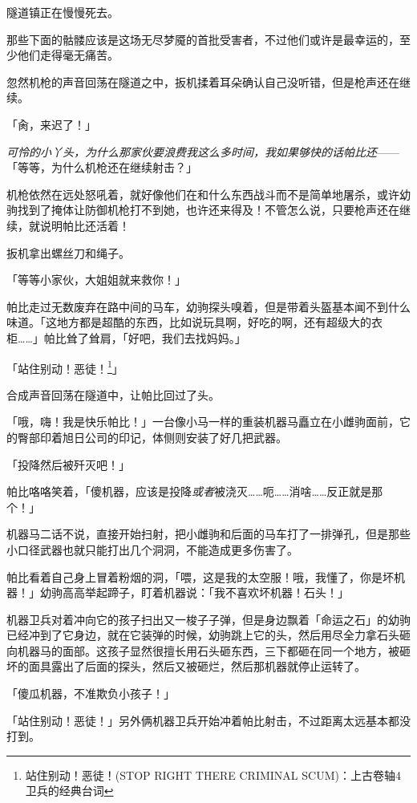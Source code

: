 隧道镇正在慢慢死去。

那些下面的骷髅应该是这场无尽梦魇的首批受害者，不过他们或许是最幸运的，至少他们走得毫无痛苦。

忽然机枪的声音回荡在隧道之中，扳机揉着耳朵确认自己没听错，但是枪声还在继续。

「肏，来迟了！」

\emph{可怜的小丫头，为什么那家伙要浪费我这么多时间，我如果够快的话帕比还}——「等等，为什么机枪还在继续射击？」

机枪依然在远处怒吼着，就好像他们在和什么东西战斗而不是简单地屠杀，或许幼驹找到了掩体让防御机枪打不到她，也许还来得及！不管怎么说，只要枪声还在继续，就说明帕比还活着！

扳机拿出螺丝刀和绳子。

「等等小家伙，大姐姐就来救你！」

\horizonline


帕比走过无数废弃在路中间的马车，幼驹探头嗅着，但是带着头盔基本闻不到什么味道。「这地方都是超酷的东西，比如说玩具啊，好吃的啊，还有超级大的衣柜……」帕比耸了耸肩，「好吧，我们去找妈妈。」

「站住别动！恶徒！\footnote{站住别动！恶徒！(STOP RIGHT THERE CRIMINAL SCUM)：上古卷轴4卫兵的经典台词}」

合成声音回荡在隧道中，让帕比回过了头。

「哦，嗨！我是快乐帕比！」一台像小马一样的重装机器马矗立在小雌驹面前，它的臀部印着旭日公司的印记，体侧则安装了好几把武器。

「投降然后被歼灭吧！」

帕比咯咯笑着，「傻机器，应该是投降\emph{或者}被浇灭……呃……消啥……反正就是那个！」

机器马二话不说，直接开始扫射，把小雌驹和后面的马车打了一排弹孔，但是那些小口径武器也就只能打出几个洞洞，不能造成更多伤害了。

帕比看着自己身上冒着粉烟的洞，「喂，这是我的太空服！哦，我懂了，你是坏机器！」幼驹高高举起蹄子，盯着机器说：「我不喜欢坏机器！石头！」

机器卫兵对着冲向它的孩子扫出又一梭子子弹，但是身边飘着「命运之石」的幼驹已经冲到了它身边，就在它装弹的时候，幼驹跳上它的头，然后用尽全力拿石头砸向机器马的面部。这孩子显然很擅长用石头砸东西，三下都砸在同一个地方，被砸坏的面具露出了后面的探头，然后又被砸烂，然后那机器就停止运转了。

「傻瓜机器，不准欺负小孩子！」

「站住别动！恶徒！」另外俩机器卫兵开始冲着帕比射击，不过距离太远基本都没打到。


